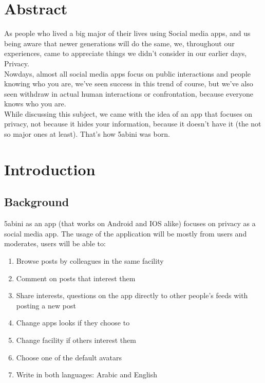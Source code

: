 \documentclass[12pt]{article}
\begin{document}
\section*{Abstract}
As people who lived a big major of their lives using Social media apps, and us being aware that newer generations will do the same, we, throughout our experiences, came to appreciate things we didn't consider in our earlier days, Privacy. \\
Nowdays, almost all social media apps focus on public interactions and people knowing who you are, we've seen success in this  trend of course, but we've also seen withdraw in actual human interactions or confrontation, because everyone knows who you are.\\  While discussing this subject, we came with the idea of an app that focuses on privacy, not because it hides your information, because it doesn't have it (the not so major ones at least). That's how 5abini was born.\sectionbreak
\


\tableofcontents
\sectionbreak







\section{Introduction}
\subsection{Background}
5abini as an app (that works on Android and IOS alike) focuses on privacy as a social media app. The usage of the application will be mostly from users and moderates, users will be able to:
\begin{enumerate}

\itemsep0em 
\item Browse posts by colleagues in the same facility
\item Comment on posts that interest them
\item Share interests, questions on the app directly to other people's feeds with posting a new post
\item Change apps looks if they choose to
\item Change facility if others interest them
\item Choose one of the default avatars
\item Write in both languages: Arabic and English
\end{enumerate}
\end{document}
